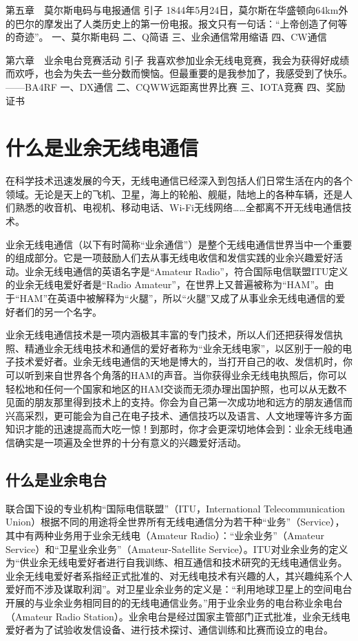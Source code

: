 \documentclass[12pt,UTF8]{ctexbook}
\begin{document}
第五章　莫尔斯电码与电报通信
引子
1844年5月24日，莫尔斯在华盛顿向64km外的巴尔的摩发出了人类历史上的第一份电报。报文只有一句话：“上帝创造了何等的奇迹”。
一、莫尔斯电码
二、Q简语
三、业余通信常用缩语
四、CW通信

第六章　业余电台竞赛活动
引子
我喜欢参加业余无线电竞赛，我会为获得好成绩而欢呼，也会为失去一些分数而懊恼。但最重要的是我参加了，我感受到了快乐。
——BA4RF
一、DX通信
二、CQWW远距离世界比赛
三、IOTA竞赛
四、奖励证书


\chapter{什么是业余无线电通信}

在科学技术迅速发展的今天，无线电通信已经深入到包括人们日常生活在内的各个领域。无论是天上的飞机、卫星，海上的轮船、舰艇，陆地上的各种车辆，还是人们熟悉的收音机、电视机、移动电话、Wi-Fi无线网络……全都离不开无线电通信技术。

业余无线电通信（以下有时简称“业余通信”）是整个无线电通信世界当中一个重要的组成部分。它是一项鼓励人们去从事无线电收信和发信实践的业余兴趣爱好活动。业余无线电通信的英语名字是“Amateur Radio”，符合国际电信联盟ITU定义的业余无线电爱好者是“Radio Amateur”，在世界上又普遍被称为“HAM”。由于“HAM”在英语中被解释为“火腿”，所以“火腿”又成了从事业余无线电通信的爱好者们的另一个名字。

业余无线电通信技术是一项内涵极其丰富的专门技术，所以人们还把获得发信执照、精通业余无线电技术和通信的爱好者称为“业余无线电家”，以区别于一般的电子技术爱好者。业余无线电通信的天地是博大的，当打开自己的收、发信机时，你可以听到来自世界各个角落的HAM的声音。当你获得业余无线电执照后，你可以轻松地和任何一个国家和地区的HAM交谈而无须办理出国护照，也可以从无数不见面的朋友那里得到技术上的支持。你会为自己第一次成功地和远方的朋友通信而兴高采烈，更可能会为自己在电子技术、通信技巧以及语言、人文地理等许多方面知识才能的迅速提高而大吃一惊！到那时，你才会更深切地体会到：业余无线电通信确实是一项遍及全世界的十分有意义的兴趣爱好活动。

\section{什么是业余电台}

联合国下设的专业机构“国际电信联盟”（ITU，International Telecommunication Union）根据不同的用途将全世界所有无线电通信分为若干种“业务”（Service），其中有两种业务用于业余无线电（Amateur Radio）：“业余业务”（Amateur Service）和“卫星业余业务”（Amateur-Satellite Service）。ITU对业余业务的定义为“供业余无线电爱好者进行自我训练、相互通信和技术研究的无线电通信业务。业余无线电爱好者系指经正式批准的、对无线电技术有兴趣的人，其兴趣纯系个人爱好而不涉及谋取利润”。对卫星业余业务的定义是：“利用地球卫星上的空间电台开展的与业余业务相同目的的无线电通信业务。”用于业余业务的电台称业余电台（Amateur Radio Station）。业余电台是经过国家主管部门正式批准，业余无线电爱好者为了试验收发信设备、进行技术探讨、通信训练和比赛而设立的电台。
\end{document}
